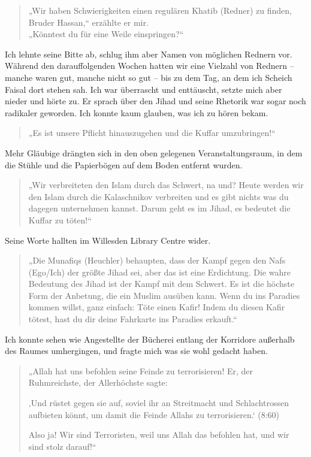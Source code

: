 \documentclass[12pt]{memoir}
\def\/{\hskip0pt/\hskip0pt}
\begin{document}
\begin{quote}
„Wir haben Schwierigkeiten einen regulären Khatib (Redner) zu finden,
Bruder Hassan,“ erzählte er mir.\\
„Könntest du für eine Weile einspringen?“
\end{quote}

Ich lehnte seine Bitte ab,
schlug ihm aber Namen von möglichen Rednern vor.
Während den darauffolgenden Wochen hatten wir eine Vielzahl von Rednern –
manche waren gut, manche nicht so gut –
bis zu dem Tag, an dem ich Scheich Faisal dort stehen sah.
Ich war überrascht und enttäuscht, setzte mich aber nieder und hörte zu.
Er sprach über den Jihad und seine Rhetorik
war sogar noch radikaler geworden.
Ich konnte kaum glauben, was ich zu hören bekam.

\begin{quote}
„Es ist unsere Pflicht hinauszugehen und die Kuffar umzubringen!“
\end{quote}

Mehr Gläubige drängten sich in den oben gelegenen Veranstaltungsraum,
in dem die Stühle und die Papierbögen auf dem Boden entfernt wurden.

\begin{quote}
„Wir verbreiteten den Islam durch das Schwert, na und?
Heute werden wir den Islam durch die Kalaschnikov verbreiten
und es gibt nichts was du dagegen unternehmen kannst.
Darum geht es im Jihad, es bedeutet die Kuffar zu töten!“
\end{quote}

Seine Worte hallten im Willesden Library Centre wider.

\begin{quote}
„Die Munafiqs (Heuchler) behaupten,
dass der Kampf gegen den Nafs (Ego\/Ich) der größte Jihad sei,
aber das ist eine Erdichtung.
Die wahre Bedeutung des Jihad ist der Kampf mit dem Schwert.
Es ist die höchste Form der Anbetung, die ein Muslim ausüben kann.
Wenn du ins Paradies kommen willst, ganz einfach:
Töte einen Kafir!
Indem du diesen Kafir tötest,
hast du dir deine Fahrkarte ins Paradies erkauft.“
\end{quote}

Ich konnte sehen wie Angestellte der Bücherei
entlang der Korridore außerhalb des Raumes umhergingen,
und fragte mich was sie wohl gedacht haben.

\begin{quote}
„Allah hat uns befohlen seine Feinde zu terrorisieren!
Er, der Ruhmreichste, der Allerhöchste sagte:

‚Und rüstet gegen sie auf, soviel ihr an Streitmacht
und Schlachtrossen aufbieten könnt,
um damit die Feinde Allahs zu terrorisieren.‘
(8:60)

Also ja! Wir sind Terroristen,
weil uns Allah das befohlen hat, und wir sind stolz darauf!“
\end{quote}
\end{document}
